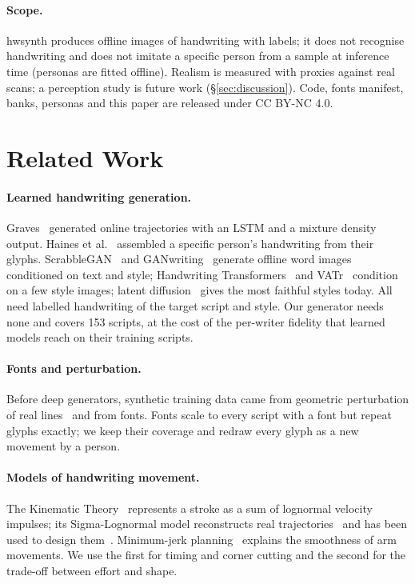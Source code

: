 \documentclass[10pt,twocolumn]{article}
\begin{document}
\paragraph{Scope.} \textsf{hwsynth} produces offline images of handwriting with labels; it does not recognise
handwriting and does not imitate a specific person from a sample at inference time (personas are fitted
offline). Realism is measured with proxies against real scans; a perception study is future work
(\S\ref{sec:discussion}). Code, fonts manifest, banks, personas and this paper are released under CC BY-NC 4.0.

\section{Related Work}
\label{sec:related}

\paragraph{Learned handwriting generation.} Graves~\cite{graves2013} generated online trajectories with an LSTM and
a mixture density output. Haines et al.~\cite{haines2016} assembled a specific person's handwriting from their
glyphs. ScrabbleGAN~\cite{fogel2020} and GANwriting~\cite{kang2020} generate offline word images conditioned on
text and style; Handwriting Transformers~\cite{bhunia2021} and VATr~\cite{pippi2023} condition on a few style
images; latent diffusion~\cite{nikolaidou2023,nikolaidou2024} gives the most faithful styles today. All need
labelled handwriting of the target script and style. Our generator needs none and covers 153 scripts, at the cost
of the per-writer fidelity that learned models reach on their training scripts.

\paragraph{Fonts and perturbation.} Before deep generators, synthetic training data came from geometric
perturbation of real lines~\cite{varga2003} and from fonts. Fonts scale to every script with a font but repeat
glyphs exactly; we keep their coverage and redraw every glyph as a new movement by a person.

\paragraph{Models of handwriting movement.} The Kinematic Theory~\cite{plamondon1995,plamondon2006} represents a
stroke as a sum of lognormal velocity impulses; its Sigma-Lognormal model reconstructs real
trajectories~\cite{ferrer2020} and has been used to design them~\cite{berio2017}. Minimum-jerk
planning~\cite{flash1985} explains the smoothness of arm movements. We use the first for timing and corner cutting
and the second for the trade-off between effort and shape.
\end{document}

